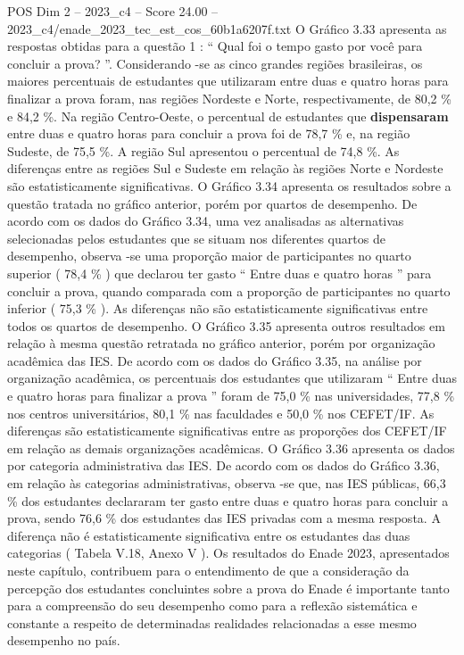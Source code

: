 \begin{textsample}{POS Dim 2 – 2023\_c4 – Score 24.00 – 2023\_c4/enade\_2023\_tec\_est\_cos\_60b1a6207f.txt}
O Gráfico 3.33 apresenta as respostas obtidas para a questão 1 : “ Qual foi o tempo gasto por você para concluir a prova? ”.
Considerando -se as cinco grandes regiões brasileiras, os maiores percentuais de estudantes que utilizaram entre duas e quatro horas para finalizar a prova foram, nas regiões Nordeste e Norte, respectivamente, de 80,2 \% e 84,2 \%.
Na região Centro-Oeste, o percentual de estudantes que \textbf{dispensaram} entre duas e quatro horas para concluir a prova foi de 78,7 \% e, na região Sudeste, de 75,5 \%.
A região Sul apresentou o percentual de 74,8 \%.
As diferenças entre as regiões Sul e Sudeste em relação às regiões Norte e Nordeste são estatisticamente significativas.
O Gráfico 3.34 apresenta os resultados sobre a questão tratada no gráfico anterior, porém por quartos de desempenho.
De acordo com os dados do Gráfico 3.34, uma vez analisadas as alternativas selecionadas pelos estudantes que se situam nos diferentes quartos de desempenho, observa -se uma proporção maior de participantes no quarto superior ( 78,4 \% ) que declarou ter gasto “ Entre duas e quatro horas ” para concluir a prova, quando comparada com a proporção de participantes no quarto inferior ( 75,3 \% ).
As diferenças não são estatisticamente significativas entre todos os quartos de desempenho.
O Gráfico 3.35 apresenta outros resultados em relação à mesma questão retratada no gráfico anterior, porém por organização acadêmica das IES.
De acordo com os dados do Gráfico 3.35, na análise por organização acadêmica, os percentuais dos estudantes que utilizaram “ Entre duas e quatro horas para finalizar a prova ” foram de 75,0 \% nas universidades, 77,8 \% nos centros universitários, 80,1 \% nas faculdades e 50,0 \% nos CEFET/IF.
As diferenças são estatisticamente significativas entre as proporções dos CEFET/IF em relação as demais organizações acadêmicas.
O Gráfico 3.36 apresenta os dados por categoria administrativa das IES.
De acordo com os dados do Gráfico 3.36, em relação às categorias administrativas, observa -se que, nas IES públicas, 66,3 \% dos estudantes declararam ter gasto entre duas e quatro horas para concluir a prova, sendo 76,6 \% dos estudantes das IES privadas com a mesma resposta.
A diferença não é estatisticamente significativa entre os estudantes das duas categorias ( Tabela V.18, Anexo V ).
Os resultados do Enade 2023, apresentados neste capítulo, contribuem para o entendimento de que a consideração da percepção dos estudantes concluintes sobre a prova do Enade é importante tanto para a compreensão do seu desempenho como para a reflexão sistemática e constante a respeito de determinadas realidades relacionadas a esse mesmo desempenho no país.

\end{textsample}
